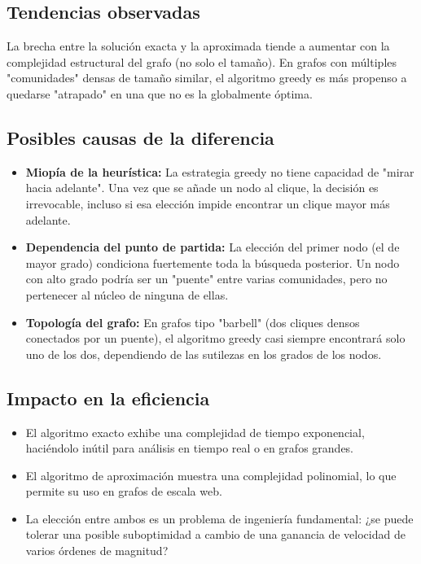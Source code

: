 \documentclass[12pt,a4paper]{report}
\begin{document}
\subsection{Tendencias observadas}
La brecha entre la solución exacta y la aproximada tiende a aumentar con la complejidad estructural del grafo (no solo el tamaño). En grafos con múltiples "comunidades" densas de tamaño similar, el algoritmo greedy es más propenso a quedarse "atrapado" en una que no es la globalmente óptima.

\subsection{Posibles causas de la diferencia}
\begin{itemize}
    \item \textbf{Miopía de la heurística:} La estrategia greedy no tiene capacidad de "mirar hacia adelante". Una vez que se añade un nodo al clique, la decisión es irrevocable, incluso si esa elección impide encontrar un clique mayor más adelante.
    \item \textbf{Dependencia del punto de partida:} La elección del primer nodo (el de mayor grado) condiciona fuertemente toda la búsqueda posterior. Un nodo con alto grado podría ser un "puente" entre varias comunidades, pero no pertenecer al núcleo de ninguna de ellas.
    \item \textbf{Topología del grafo:} En grafos tipo "barbell" (dos cliques densos conectados por un puente), el algoritmo greedy casi siempre encontrará solo uno de los dos, dependiendo de las sutilezas en los grados de los nodos.
\end{itemize}

\subsection{Impacto en la eficiencia}
\begin{itemize}
    \item El algoritmo exacto exhibe una complejidad de tiempo exponencial, haciéndolo inútil para análisis en tiempo real o en grafos grandes.
    \item El algoritmo de aproximación muestra una complejidad polinomial, lo que permite su uso en grafos de escala web.
    \item La elección entre ambos es un problema de ingeniería fundamental: ¿se puede tolerar una posible suboptimidad a cambio de una ganancia de velocidad de varios órdenes de magnitud?
\end{itemize}
\end{document}
